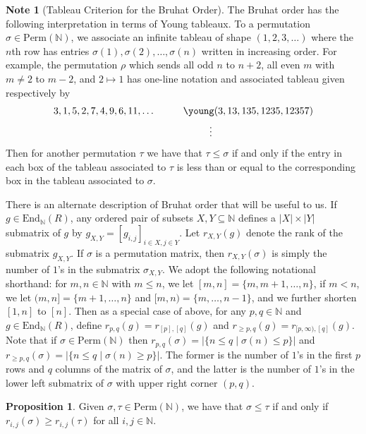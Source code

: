 \documentclass[oneside,11pt]{amsart}
\newcommand{\nn}{\ensuremath{\mathbb{N}}}
\newcommand{\Perm}{\ensuremath{\text{Perm}}}
\newcommand{\End}{\ensuremath{\text{End}}}
\theoremstyle{definition}
\newtheorem{proof techniques}{Proof Techniques}
\newtheorem{note}{Note}
\newtheorem{proposition}{Proposition}
\begin{document}
\begin{note}[Tableau Criterion for the Bruhat Order]
The Bruhat order has the following interpretation in terms of Young tableaux. To a permutation $\sigma \in \Perm(\nn)$, we associate an infinite tableau of shape $(1 , 2 , 3 , \ldots )$ where the $n$th row has entries $\sigma(1) , \sigma(2) , \ldots, \sigma(n)$ written in increasing order. For example, the permutation $\rho$ which sends all odd $n$ to $n + 2$, all even $m$ with $m \neq 2$ to $m - 2$, and $2 \mapsto 1$ has one-line notation and associated tableau given respectively by 
\begin{align*}
3, 1, 5, 2, 7, 4, 9, 6, 11 , \ldots \ \ \ \ \ \ \ \ \ &\young(3,13,135,1235,12357)
\\ &\ \ \ \ \ \ \ \ \vdots
\end{align*}
Then for another permutation $\tau$ we have that $\tau \leq \sigma$ if and only if the entry in each box of the tableau associated to $\tau$ is less than or equal to the corresponding box in the tableau associated to $\sigma$.
\end{note} 


There is an alternate description of Bruhat order that will be useful to us. If $g \in \End_\nn(R)$, any ordered pair of subsets $X , Y \subseteq \nn$ defines a $|X| \times |Y|$ submatrix of $g$ by $g_{X,Y} = [ g_{i,j} ]_{i \in X, j \in Y}$. Let $r_{X , Y}(g)$ denote the rank of the submatrix $g_{X , Y}$. If $\sigma$ is a permutation matrix, then $r_{X , Y}(\sigma)$ is simply the number of $1$'s in the submatrix $\sigma_{X , Y}$. We adopt the following notational shorthand: for $m , n \in \nn$ with $m \leq n$, we let $[m , n] = \{ m , m + 1 , \ldots , n \}$, if $m < n$, we let $(m , n] = \{ m+ 1, \ldots, n\}$ and $[m ,n) = \{ m,\ldots, n-1 \}$, and we further shorten $[1 , n]$ to $[n]$. Then as a special case of above, for any $p , q \in \nn$ and $g \in \End_\nn(R)$, define $r_{p , q}(g) = r_{[p],[q]}(g)$ and $r_{\geq p , q}(g) = r_{[p, \infty), [q]}(g)$. Note that if $\sigma \in \Perm(\nn)$ then $r_{p , q}(\sigma) =  | \{ n \leq q \mid \sigma(n) \leq p \} |$ and $r_{\geq p , q}(\sigma) = | \{ n \leq q \mid \sigma(n) \geq p \} |$. The former is the number of $1$'s in the first $p$ rows and $q$ columns of the matrix of $\sigma$, and the latter is the number of $1$'s in the lower left submatrix of $\sigma$ with upper right corner $(p, q)$. 

\begin{proposition}\label{prop: region criterion for bruhat order}
Given $\sigma, \tau \in \Perm(\nn)$, we have that $\sigma \leq \tau$ if and only if $r_{i , j}(\sigma) \geq r_{i , j}(\tau)$ for all $i, j \in \nn$.
\end{proposition}
\end{document}
